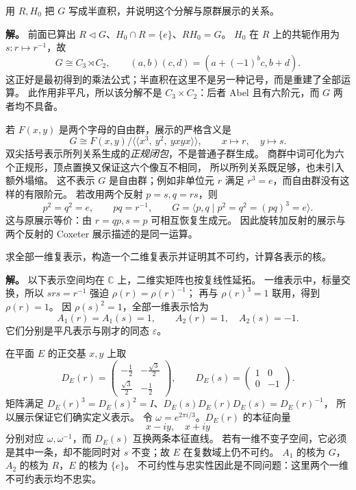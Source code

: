\begin{workedexample}
\label{ex:d3-comprehensive-semidirect}
用 $R,H_0$ 把 $G$ 写成半直积，并说明这个分解与原群展示的关系。

\textbf{解。} 前面已算出 $R\lhd G$、$H_0\cap R=\{e\}$、$RH_0=G$。
$H_0$ 在 $R$ 上的共轭作用为 $s:r\mapsto r^{-1}$，故
\[
G\cong C_3\rtimes C_2,
\qquad (a,b)(c,d)=(a+(-1)^b c,b+d).
\]
这正好是最初得到的乘法公式；半直积在这里不是另一种记号，而是重建了全部运算。
此作用非平凡，所以该分解不是 $C_3\times C_2$：后者 Abel 且有六阶元，而 $G$ 两者均不具备。

若 $F(x,y)$ 是两个字母的自由群，展示的严格含义是
\[
G\cong F(x,y)\big/\langle\!\langle
x^3,\ y^2,\ yxyx
\rangle\!\rangle,
\qquad x\mapsto r,\quad y\mapsto s.
\]
双尖括号表示所列关系生成的\emph{正规闭包}，不是普通子群生成。
商群中词可化为六个正规形，顶点置换又保证这六个像互不相同，
所以所列关系既足够，也未引入额外塌缩。
这不表示 $G$ 是自由群；例如非单位元 $r$ 满足 $r^3=e$，而自由群没有这样的有限阶元。
若改用两个反射 $p=s,q=rs$，则
\[
p^2=q^2=e,\qquad pq=r^{-1},\qquad
G=\langle p,q\mid p^2=q^2=(pq)^3=e\rangle.
\]
这与原展示等价：由 $r=qp,s=p$ 可相互恢复生成元。
因此旋转加反射的展示与两个反射的 Coxeter 展示描述的是同一运算。
\end{workedexample}

\begin{workedexample}[从生成元矩阵构造全部不可约复表示]
\label{ex:d3-comprehensive-irreps}
求全部一维复表示，构造一个二维复表示并证明其不可约，计算各表示的核。

\textbf{解。} 以下表示空间均在 $\mathbb C$ 上，二维实矩阵也按复线性延拓。
一维表示中，标量交换，所以 $srs=r^{-1}$ 强迫 $\rho(r)=\rho(r)^{-1}$；
再与 $\rho(r)^3=1$ 联用，得到 $\rho(r)=1$。
因 $\rho(s)^2=1$，全部一维表示恰为
\[
A_1(r)=A_1(s)=1,\qquad A_2(r)=1,\quad A_2(s)=-1.
\]
它们分别是平凡表示与刚才的同态 $\varepsilon$。

在平面 $E$ 的正交基 $x,y$ 上取
\[
D_E(r)=\begin{pmatrix}-\frac12&-\frac{\sqrt3}{2}\\
\frac{\sqrt3}{2}&-\frac12\end{pmatrix},\qquad
D_E(s)=\begin{pmatrix}1&0\\0&-1\end{pmatrix}.
\]
矩阵满足 $D_E(r)^3=D_E(s)^2=I$、$D_E(s)D_E(r)D_E(s)=D_E(r)^{-1}$，
所以展示保证它们确实定义表示。
令 $\omega=e^{2\pi i/3}$。$D_E(r)$ 的本征向量
\[
x-iy,\quad x+iy
\]
分别对应 $\omega,\omega^{-1}$，而 $D_E(s)$ 互换两条本征直线。
若有一维不变子空间，它必须是其中一条，却不能同时对 $s$ 不变；故 $E$ 在复数域上仍不可约。
$A_1$ 的核为 $G$，$A_2$ 的核为 $R$，$E$ 的核为 $\{e\}$。
不可约性与忠实性因此是不同问题：这里两个一维不可约表示均不忠实。
\end{workedexample}

